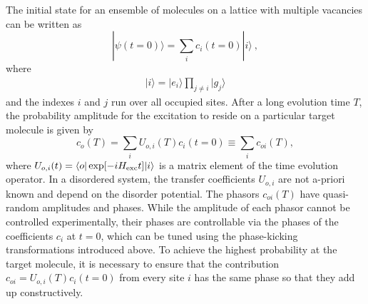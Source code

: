 %

The initial state for an ensemble of molecules on a lattice with multiple vacancies can be written as 
\begin{equation}
|\psi(t=0)\rangle = \sum_{i}c_i(t=0)|i\rangle \ , \label{planewave-initial}
\end{equation}
where 
\begin{eqnarray}
| i \rangle = |e_i\rangle \prod_{j\neq i} |g_j\rangle
\end{eqnarray}
and the indexes $i$ and $j$ run over all occupied sites. After a long evolution time $T$, the probability amplitude for the excitation to reside on a particular target molecule is given by  
\begin{equation}
c_{o}(T) = \sum_{i} U_{o, i}(T)c_i(t=0) \equiv \sum_i c_{oi}(T), 
\label{site-contribution}
\end{equation}
where $U_{o,i}(t) = \langle o| \exp[-iH_{\rm exc}t] | i \rangle$ is a matrix element of the time evolution operator.
%
{In a disordered system, the transfer coefficients $U_{o, i}$
are not a-priori known and depend on the
disorder potential. The {phasors} $c_{oi}(T)$ have quasi-random
amplitudes and phases. While the amplitude of each phasor cannot be controlled experimentally, 
their phases are controllable via the phases of the coefficients $c_i$ at $t=0$, which can be tuned using the phase-kicking
transformations introduced above.} To achieve the highest probability
at the target molecule, it is necessary to ensure that the contribution
$c_{oi}=U_{o, i}(T)c_i(t=0)$ from every site $i$ has the same
phase so that they add up constructively.

